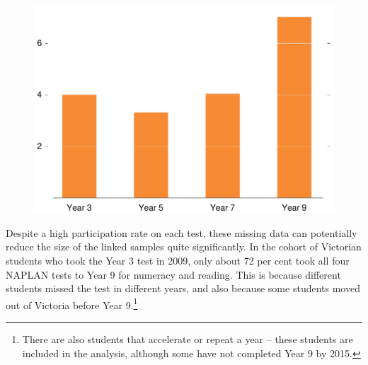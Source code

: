 \begin{figure}[t]
 \includegraphics[width=\columnwidth]{atlas/Absent_pc.pdf}\label{fig:absent_pc}

\end{figure}

Despite a high participation rate on each test, these missing data can potentially reduce the size of the linked samples quite significantly. In the cohort of Victorian students who took the Year 3 test in 2009, only about 72 per cent took all four NAPLAN tests to Year 9 for numeracy and reading. This is because different students missed the test in different years, and also because some students moved out of Victoria before Year 9.\footnote{There are also students that accelerate or repeat a year -- these students are included in the analysis, although some have not completed Year 9 by 2015.}

